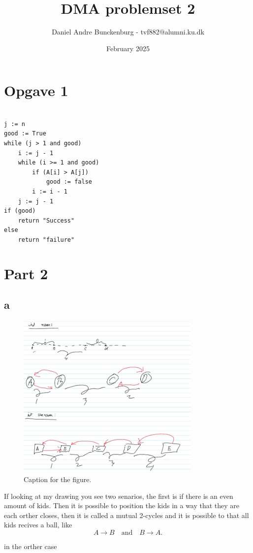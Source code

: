 \documentclass{article}
\title{DMA problemset 2}
\author{Daniel Andre Bunckenburg - tvf882@alumni.ku.dk}
\date{February 2025}
\begin{document}
\maketitle

\section{Opgave 1}



\begin{verbatim}

j := n
good := True
while (j > 1 and good) 
    i := j - 1
    while (i >= 1 and good)
        if (A[i] > A[j])
            good := false
        i := i - 1
    j := j - 1
if (good)
    return "Success"
else
    return "failure"

\end{verbatim}



\newpage
\section{Part 2}


\subsection{a}

\begin{figure}[h!]
    \centering
    \includegraphics[width=0.8\textwidth]{Figures/figure_1.jpg}
    \caption{Caption for the figure.}
    \label{fig:myfigure}
\end{figure}

If looking at my drawing you see two senarios, the first is if there is an even amount of kids. Then it is possible to position the kids in a way that they are each orther closes, then it is called a mutual 2-cycles and it is possible to that all kids recives a ball, like 
\[
A \to B \quad \text{and} \quad B \to A.
\]

in the orther case
\end{document}
